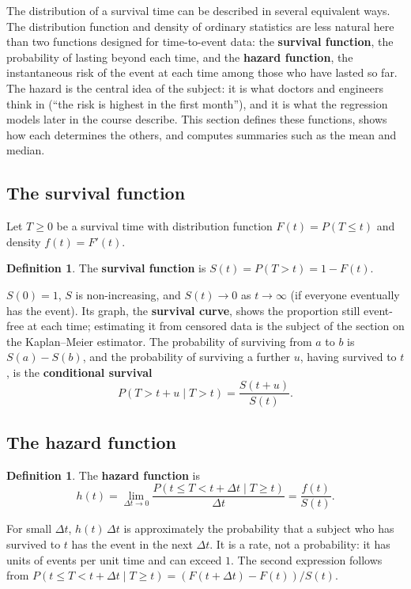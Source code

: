 \documentclass[11pt,a4paper]{article}
\numberwithin{equation}{section}
\theoremstyle{definition}
\newtheorem{defn}[thm]{Definition}
\begin{document}
The distribution of a survival time can be described in several equivalent ways. The distribution function and density of ordinary statistics are less natural here than two functions designed for time-to-event data: the \textbf{survival function}, the probability of lasting beyond each time, and the \textbf{hazard function}, the instantaneous risk of the
event at each time among those who have lasted so far. The hazard is the central idea of the subject: it is what doctors and engineers think in (``the risk is highest in the first month''), and it is what the regression models later in the course describe. This section defines these functions, shows how each determines the others, and computes summaries such as the mean and
median.

\subsection{The survival function}
\label{ssec:survivalfn}

Let $T \geq 0$ be a survival time with distribution function $F(t) = P(T \leq t)$ and density $f(t) = F'(t)$.

\begin{defn}
The \textbf{survival function} is $S(t) = P(T > t) = 1 - F(t)$.
\end{defn}

$S(0) = 1$, $S$ is non-increasing, and $S(t) \to 0$ as $t \to \infty$ (if everyone eventually has the event). Its graph, the \textbf{survival curve}, shows the proportion still event-free at each time; estimating it from censored data is the subject of the section on the Kaplan--Meier estimator. The probability of surviving from $a$ to $b$ is $S(a) - S(b)$, and the probability of
surviving a further $u$, having survived to $t$, is the \textbf{conditional survival}
\[
P(T > t + u \mid T > t) = \frac{S(t + u)}{S(t)} .
\]

\subsection{The hazard function}
\label{ssec:hazard}

\begin{defn}
The \textbf{hazard function} is
\[
h(t) = \lim_{\Delta t \to 0}\frac{P(t \leq T < t + \Delta t \mid T \geq t)}{\Delta t} = \frac{f(t)}{S(t)} .
\]
\end{defn}

For small $\Delta t$, $h(t)\,\Delta t$ is approximately the probability that a subject who has survived to $t$ has the event in the next $\Delta t$. It is a rate, not a probability: it has units of events per unit time and can exceed $1$. The second expression follows from $P(t \leq T < t + \Delta t \mid T \geq t) = (F(t + \Delta t) - F(t))/S(t)$.
\end{document}
